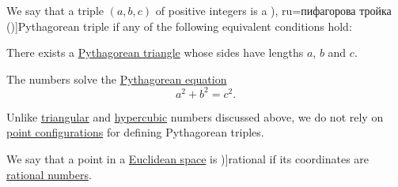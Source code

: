 \begin{definition}\label{def:pythagorean_triple}
  We say that a triple \( (a, b, c) \) of positive integers is a \term[en=Pythagorean triple (\cite[\S 4.3.1]{Deza2012FigurateNumbers}), ru=пифагорова тройка (\cite[27]{ГашковЧубариков2005СложностьВычисления})]{Pythagorean triple} if any of the following equivalent conditions hold:
  \begin{thmenum}
    \mimprovised There exists a \hyperref[def:pythagorean_triangle]{Pythagorean triangle} whose sides have lengths \( a \), \( b \) and \( c \).

     The numbers solve the \hyperref[def:fermats_equation]{Pythagorean equation}
    \begin{equation}\label{eq:def:pythagorean_triple}
      a^2 + b^2 = c^2.
    \end{equation}
  \end{thmenum}
\end{definition}
\begin{comments}
  \item Unlike \hyperref[def:triangular_number]{triangular} and \hyperref[def:hypercubic_number]{hypercubic} numbers discussed above, we do not rely on \hyperref[def:point_configuration]{point configurations} for defining Pythagorean triples.
\end{comments}

\begin{definition}\label{def:rational_point}
  We say that a point in a \hyperref[def:euclidean_space]{Euclidean space} is \term[ru=рациональная (точка) (\cite[22]{Александров1977ОбщаяТопология})]{rational} if its coordinates are \hyperref[def:rational_numbers]{rational numbers}.
\end{definition}

